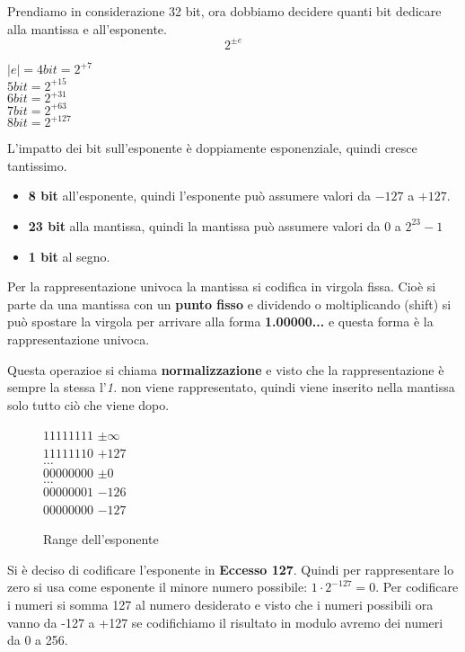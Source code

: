 \documentclass[a4paper]{article}
\theoremstyle{break}
\theoremstyle{break}
\theoremstyle{break}
\theoremstyle{break}
\begin{document}
Prendiamo in considerazione 32 bit, ora dobbiamo decidere quanti bit dedicare
alla mantissa e all'esponente.
\[
	2^{\pm e}
\]
\begin{center}
	$|e| = 4 bit = 2^{+7}$\\
	$5 bit = 2^{+15}$\\
	$6 bit = 2^{+31}$\\
	$7 bit = 2^{+63}$\\
	$8 bit = 2^{+127}$
\end{center}
L'impatto dei bit sull'esponente è doppiamente esponenziale, quindi cresce tantissimo.

\begin{itemize}
	\item \textbf{8 bit} all'esponente, quindi l'esponente
	      può assumere valori da \( -127 \) a \( +127 \).
	\item \textbf{23 bit} alla mantissa, quindi la mantissa
	      può assumere valori da \( 0 \) a \( 2^{23}-1 \)
	\item \textbf{1 bit} al segno.
\end{itemize}

\begin{center}
\end{center}
Per la rappresentazione univoca la mantissa si codifica in virgola fissa.
Cioè si parte da una mantissa con un \textbf{punto fisso} e dividendo o moltiplicando (shift) si
può spostare la virgola per arrivare alla forma \textbf{1.00000...} e questa forma è la
rappresentazione univoca.

Questa operazioe si chiama \textbf{normalizzazione} e visto che la
rappresentazione è sempre la stessa l'\emph{1.} non viene rappresentato, quindi
viene inserito nella mantissa solo tutto ciò che viene dopo.
\begin{figure}[H]
	\begin{center}
		\( 11111111 \) \( \pm \infty \)\\
		\( 11111110 \) \( +127 \) \\
		\( \ldots \)\\
		\( 00000000 \) \( \pm 0 \)\\
		\( \ldots \)\\
		\( 00000001 \) \( -126 \) \\
		\( 00000000 \) \( -127 \)
	\end{center}
	\caption{Range dell'esponente}
\end{figure}
Si è deciso di codificare l'esponente in \textbf{Eccesso 127}. Quindi per
rappresentare lo zero si usa come esponente il minore numero possibile:
$1 \cdot 2^{-127} = 0$. Per codificare i numeri si somma 127 al numero desiderato
e visto che i numeri possibili ora vanno da -127 a +127 se codifichiamo
il risultato in modulo avremo dei numeri da 0 a 256.
\end{document}
